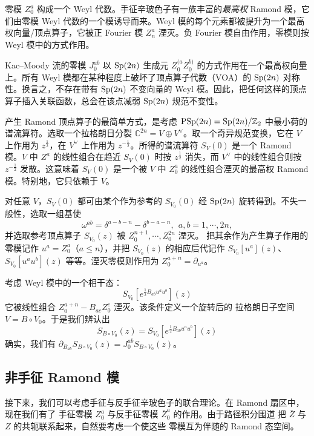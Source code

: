 零模 $Z^a_0$ 构成一个 Weyl 代数。手征辛玻色子有一族丰富的{\it 最高权} Ramond 模，它们由零模 Weyl 代数的一个模诱导而来。Weyl 模的每个元素都被提升为一个最高权向量/顶点算子，它被正 Fourier 模 $Z^a_n$ 湮灭。负 Fourier 模自由作用，零模则按 Weyl 模中的方式作用。 


Kac–Moody 流的零模 $J_0^{ab}$ 以 ${\mathrm{Sp}}(2n)$ 生成元 $Z^{(a}_0 Z^{b)}_0$ 的方式作用在一个最高权向量上。所有 Weyl 模都在某种程度上破坏了顶点算子代数（VOA）的 ${\mathrm{Sp}}(2n)$ 对称性。换言之，不存在带有 ${\mathrm{Sp}}(2n)$ 不变向量的 Weyl 模。因此，把任何这样的顶点算子插入关联函数，总会在该点减弱 ${\mathrm{Sp}}(2n)$ 规范不变性。 

产生 Ramond 顶点算子的最简单方式，是考虑 ${\mathrm{PSp}}(2n)={\mathrm{Sp}}(2n)/{\mathbb Z}_2$ 中最小荷的谱流算符。选取一个拉格朗日分裂 $\mathbb{C}^{2n} = V \oplus V^\vee$。取一个奇异规范变换，它在 $V$ 上作用为 $z^{\frac12}$，在 $V^\vee$ 上作用为 $z^{-\frac12}$。所得的谱流算符 $S_V(0)$ 是一个 Ramond 模。$V$ 中 $Z^a$ 的线性组合在趋近 $S_V(0)$ 时按 $z^{\frac12}$ 消失，而 $V^\vee$ 中的线性组合则按 $z^{-\frac12}$ 发散。这意味着 $S_V(0)$ 是一个被 $V$ 中 $Z_0^a$ 的线性组合湮灭的最高权 Ramond 模。特别地，它只依赖于 $V$。 

对任意 $V$，$S_V(0)$ 都可由某个作为参考的 $S_{V_0}(0)$ 经 ${\mathrm{Sp}}(2n)$ 旋转得到。不失一般性，选取一组基使
\begin{equation}
\omega^{ab} = \delta^{a-b-n}- \delta^{b-a-n},~~a,b=1,\cdots, 2n,\end{equation}
并选取参考顶点算子 $S_{V_0}(z)$ 被 $Z^{n+1}_0, \cdots, Z^{2n}_0$ 湮灭。 
把其余作为产生算子作用的零模记作 $u^a=Z_0^a$（$a\leq n$），并把 $S_{V_0}(z)$ 的相应后代记作 $S_{V_0}[u^a](z)$、$S_{V_0}[u^a u^b](z)$ 等等。湮灭零模则作用为 $Z_0^{a+n}=\partial_{u^a}$。

考虑 Weyl 模中的一个相干态：
\begin{equation}
S_{V_0}[e^{\frac12 B_{ab} u^a u^b}](z)
\end{equation}
它被线性组合 $Z^{a+n}_0 - B_{ac} Z^c_0$ 湮灭。该条件定义一个旋转后的
拉格朗日子空间 $V = B \circ V_0$。于是我们辨认出
\begin{equation}
S_{B \circ V_0}(z) = S_{V_0}[e^{\frac12 B_{ab} u^a u^b}](z)
\end{equation}
确实，我们有 $\partial_{B_{ab}}S_{B \circ V_0}(z) = J_0^{ab}S_{B \circ V_0}(z)$。 

\subsection{非手征 Ramond 模}
接下来，我们可以考虑手征与反手征辛玻色子的联合理论。在 Ramond 扇区中，现在我们有了
手征零模 $Z_0^a$ 与反手征零模 $\bar Z_0^a$ 的作用。由于路径积分围道
把 $\bar Z$ 与 $Z$ 的共轭联系起来，自然要考虑一个使这些
零模互为伴随的 Ramond 态空间。 

